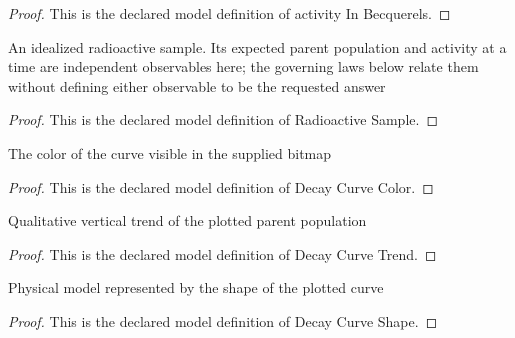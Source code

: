 \begin{proof}
  This is the declared model definition of activity In Becquerels.
\end{proof}
\begin{definition}
  \label{def:physics:phyx-mini-0576:phyxminiproblems-problemphyxmini0576-radioactivesample}
  An idealized radioactive sample. Its expected parent population and activity at a time are independent observables here; the governing laws below relate them without defining either observable to be the requested answer
\end{definition}
\begin{proof}
  This is the declared model definition of Radioactive Sample.
\end{proof}
\begin{definition}
  \label{def:physics:phyx-mini-0576:phyxminiproblems-problemphyxmini0576-decaycurvecolor}
  The color of the curve visible in the supplied bitmap
\end{definition}
\begin{proof}
  This is the declared model definition of Decay Curve Color.
\end{proof}
\begin{definition}
  \label{def:physics:phyx-mini-0576:phyxminiproblems-problemphyxmini0576-decaycurvetrend}
  Qualitative vertical trend of the plotted parent population
\end{definition}
\begin{proof}
  This is the declared model definition of Decay Curve Trend.
\end{proof}
\begin{definition}
  \label{def:physics:phyx-mini-0576:phyxminiproblems-problemphyxmini0576-decaycurveshape}
  Physical model represented by the shape of the plotted curve
\end{definition}
\begin{proof}
  This is the declared model definition of Decay Curve Shape.
\end{proof}
